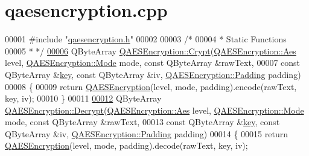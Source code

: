 \hypertarget{qaesencryption_8cpp_source}{}\section{qaesencryption.\+cpp}
\label{qaesencryption_8cpp_source}

\begin{DoxyCode}
00001 \textcolor{preprocessor}{#include "\hyperlink{qaesencryption_8h}{qaesencryption.h}"}
00002 
00003 \textcolor{comment}{/*}
00004 \textcolor{comment}{ * Static Functions}
00005 \textcolor{comment}{ * */}
\hypertarget{qaesencryption_8cpp_source.tex_l00006}{}\hyperlink{class_q_a_e_s_encryption_a43819eeb6a7cb29fbd3cb6ad640dcbdf}{00006} QByteArray \hyperlink{class_q_a_e_s_encryption_a43819eeb6a7cb29fbd3cb6ad640dcbdf}{QAESEncryption::Crypt}(\hyperlink{class_q_a_e_s_encryption_abe48208f4f6c7d68e6a10b49b9d0b7bd}{QAESEncryption::Aes} level, 
      \hyperlink{class_q_a_e_s_encryption_ad3e031c49a3d56566379d75b40b7b255}{QAESEncryption::Mode} mode, \textcolor{keyword}{const} QByteArray &rawText,
00007                                  \textcolor{keyword}{const} QByteArray &\hyperlink{namespace_errors_dict_setup_a09c268098d09ffb8e5504f30fa6d5dd9}{key}, \textcolor{keyword}{const} QByteArray &iv, 
      \hyperlink{class_q_a_e_s_encryption_ab0a65cdea4eac21ef32530010d1b0247}{QAESEncryption::Padding} padding)
00008 \{
00009     \textcolor{keywordflow}{return} \hyperlink{class_q_a_e_s_encryption_aeac0ee8532e69e5d30b023fe38c30b3b}{QAESEncryption}(level, mode, padding).encode(rawText, key, iv);
00010 \}
00011 
\hypertarget{qaesencryption_8cpp_source.tex_l00012}{}\hyperlink{class_q_a_e_s_encryption_af9baa154a06683049d941bd06ac698fd}{00012} QByteArray \hyperlink{class_q_a_e_s_encryption_af9baa154a06683049d941bd06ac698fd}{QAESEncryption::Decrypt}(\hyperlink{class_q_a_e_s_encryption_abe48208f4f6c7d68e6a10b49b9d0b7bd}{QAESEncryption::Aes} level, 
      \hyperlink{class_q_a_e_s_encryption_ad3e031c49a3d56566379d75b40b7b255}{QAESEncryption::Mode} mode, \textcolor{keyword}{const} QByteArray &rawText,
00013                                    \textcolor{keyword}{const} QByteArray &\hyperlink{namespace_errors_dict_setup_a09c268098d09ffb8e5504f30fa6d5dd9}{key}, \textcolor{keyword}{const} QByteArray &iv, 
      \hyperlink{class_q_a_e_s_encryption_ab0a65cdea4eac21ef32530010d1b0247}{QAESEncryption::Padding} padding)
00014 \{
00015      \textcolor{keywordflow}{return} \hyperlink{class_q_a_e_s_encryption_aeac0ee8532e69e5d30b023fe38c30b3b}{QAESEncryption}(level, mode, padding).decode(rawText, key, iv);

\end{DoxyCode}
